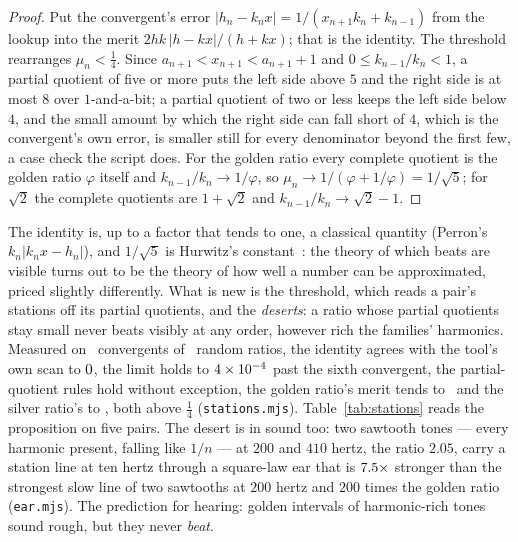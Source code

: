 \begin{proof}
Put the convergent's error $|h_n-k_nx|=1/(x_{n+1}k_n+k_{n-1})$ from the
lookup into the merit $2hk\,|h-kx|/(h+kx)$; that is the identity. The
threshold rearranges $\mu_n<\tfrac14$. Since $a_{n+1}<x_{n+1}<a_{n+1}+1$
and $0\le k_{n-1}/k_n<1$, a partial quotient of five or more puts the left
side above $5$ and the right side is at most $8$ over $1$-and-a-bit; a
partial quotient of two or less keeps the left side below $4$, and the
small amount by which the right side can fall short of $4$, which is the
convergent's own error, is smaller still for every denominator beyond the
first few, a case check the script does. For the golden ratio every
complete quotient is the golden ratio $\varphi$ itself and
$k_{n-1}/k_n\to1/\varphi$, so $\mu_n\to1/(\varphi+1/\varphi)=1/\sqrt5$; for
$\sqrt2$ the complete quotients are $1+\sqrt2$ and $k_{n-1}/k_n\to\sqrt2-1$.
\end{proof}

The identity is, up to a factor that tends to one, a classical quantity
(Perron's $k_n|k_nx-h_n|$), and $1/\sqrt5$ is Hurwitz's
constant~\cite{Hurwitz1891Annaherung, Khinchin1964Continued}: the theory of
which beats are visible turns out to be the theory of how well a number can
be approximated, priced slightly differently. What is new is the threshold,
which reads a pair's stations off its partial quotients, and the
\emph{deserts}: a ratio whose partial quotients stay small never beats
visibly at any order, however rich the families' harmonics. Measured on
\stationsConvergents\ convergents of \stationsRatios\ random ratios, the
identity agrees with the tool's own scan to $0$, the
limit holds to $4\times 10^{-4}$ past the sixth convergent, the
partial-quotient rules hold without exception, the golden ratio's merit
tends to \stationsGoldenMerit\ and the silver ratio's to
\stationsSilverMerit, both above $\tfrac14$ (\texttt{stations.mjs}).
Table~\ref{tab:stations} reads the proposition on five pairs. The desert is
in sound too: two sawtooth tones --- every harmonic present, falling like
$1/n$ --- at $200$ and $410$ hertz, the ratio $2.05$, carry a station line
at ten hertz through a square-law ear that is $7.5\times$
stronger than the strongest slow line of two sawtooths at $200$ hertz and
$200$ times the golden ratio (\texttt{ear.mjs}). The prediction for
hearing: golden intervals of harmonic-rich tones sound rough, but they
never \emph{beat}.

\begin{table}[t]
  \centering\small
  
  \caption{ For each
  pair, the first convergents of its pitch ratio; the ones the threshold
  makes visible stations are in bold. $\pi$ beats at $3$, $22/7$ and
  $355/113$, because its partial quotients $7$, $15$ and $292$ are large;
  $e$ at $19/7$ and later at $193/71$; $\sqrt2$, whose quotients are all
  $2$, at nothing; the $41{:}20$ pair at its octave. Generated from
  \texttt{stations.json}.}
  \label{tab:stations}
\end{table}

